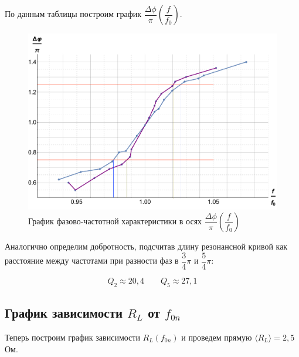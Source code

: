 \documentclass[a4paper, 12pt]{article}
\begin{document}
            По данным таблицы построим график $ \dfrac{\Delta\phi}{\pi}  \left( \dfrac{f}{f_0} \right) $.

            \begin{figure}[h!]
                \includegraphics[scale=0.5]{img/Fii.pdf}
                \caption{График фазово-частотной характеристики в осях $ \dfrac{\Delta\phi}{\pi}  \left( \dfrac{f}{f_0} \right) $}
            \end{figure}

            Аналогично определим добротность, подсчитав длину резонансной кривой как  расстояние между частотами при разности фаз в $ \dfrac{3}{4}\pi $ и $ \dfrac{5}{4}\pi $:

            \begin{equation}\label{}
            Q_2 \approx 20,4 \qquad Q_5 \approx 27,1
            \end{equation}

        \subsection{График  зависимости $ R_L $ от $ f_{0n} $}

            Теперь построим график зависимости $ R_L (f_{0n}) $ и проведем прямую $ \langle R_L \rangle = 2,5 $ Ом.
\end{document}
